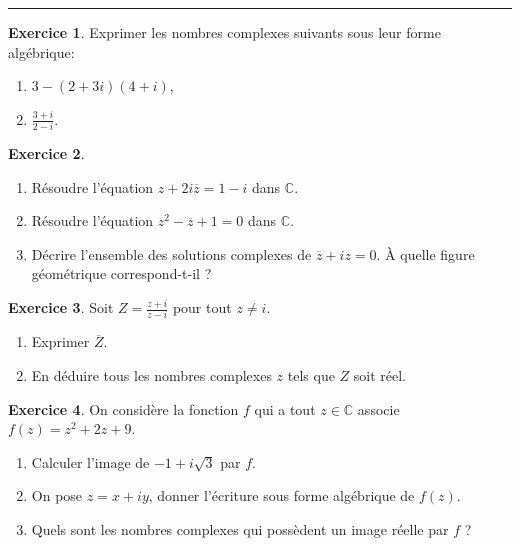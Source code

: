 \documentclass{exam}
\theoremstyle{definition}
\newtheorem{exercice}{Exercice}
\begin{document}
\Large


\medskip\hrule
\vspace{2em}

\begin{exercice}Exprimer les nombres complexes suivants sous leur forme algébrique:
    \begin{enumerate}
        \item $3-(2+3i)(4+i)$,
        \item $\frac{3+i}{2-i}$.
    \end{enumerate}
\end{exercice}

\vspace{1em}

\begin{exercice}\ 
    
    \begin{enumerate}
        \item Résoudre l'équation  $z + 2i \overline{z} = 1 - i$ dans $\mathbb{C}$.
        \item Résoudre l'équation $z^2 - \overline{z} + 1 = 0$ dans $\mathbb{C}$.
        \item Décrire l'ensemble des solutions complexes de $\overline{z} + iz = 0$. À quelle figure géométrique correspond-t-il ?
    \end{enumerate}
    
\end{exercice}

\vspace{1em}

\begin{exercice}
    Soit $Z= \frac{z+i}{z-i}$ pour tout $z\neq i$.
    \begin{enumerate}
        \item Exprimer $\overline{Z}$.
        \item En déduire tous les nombres complexes $z$ tels que $Z$ soit réel.
    \end{enumerate}
\end{exercice}

\vspace{1em}

\begin{exercice}
    On considère la fonction $f$ qui a tout $z \in \mathbb{C}$ associe $f(z) = z^2+2z+9$.
    \begin{enumerate}
        \item Calculer l'image de $-1+i\sqrt{3}$ par $f$.
        \item On pose $z = x + iy$, donner l'écriture sous forme algébrique de $f(z)$.
        \item Quels sont les nombres complexes qui possèdent un image réelle par $f$ ?
    \end{enumerate}
\end{exercice}
\end{document}
